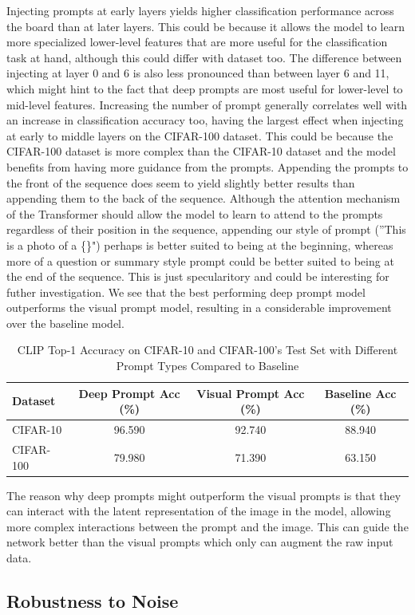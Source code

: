 \documentclass[a4paper]{article}
\begin{document}
Injecting prompts at early layers yields higher classification performance across the board than at later layers. This could be because it allows the model to learn more specialized lower-level
features that are more useful for the classification task at hand, although this could differ with dataset too. The
difference between injecting at layer 0 and 6 is also less pronounced than between layer 6 and 11, which might hint to
the fact that deep prompts are most useful for lower-level to mid-level features.
\newline \newline
Increasing the number of prompt generally correlates well with an increase in classification accuracy too, having
the largest effect when injecting at early to middle layers on the CIFAR-100 dataset. This could be because the
CIFAR-100 dataset is more complex than the CIFAR-10 dataset and the model benefits from having more guidance from the
prompts.
\newline \newline
Appending the prompts to the front of the sequence does seem to yield
slightly better results than appending them to the back of the sequence. Although the attention mechanism of the
Transformer should allow the model to learn to attend to the prompts regardless of their position in the sequence,
appending our style of prompt (''This is a photo of a \{\}") perhaps is better suited to being at the beginning,
whereas more of a question or summary style prompt could be better suited to being at the end of the sequence. This
is just specularitory and could be interesting for futher investigation.
\newline \newline
We see that the best performing deep prompt model outperforms the visual prompt model, resulting in a considerable
improvement over the baseline model. 
\begin{table}[h]
    \centering
    \begin{tabular}{|l|c|c|c|}
    \hline
    \rowcolor{Gray}
    \textbf{Dataset} & \textbf{Deep Prompt Acc (\%)} & \textbf{Visual Prompt Acc (\%)} & \textbf{Baseline Acc (\%)} \\ \hline
    CIFAR-10 & 96.590 & 92.740 & 88.940 \\ \hline
    CIFAR-100 & 79.980 & 71.390 & 63.150 \\ \hline
    \end{tabular}
    \caption{CLIP Top-1 Accuracy on CIFAR-10 and CIFAR-100's Test Set with Different Prompt Types Compared to Baseline}
    \label{tab:clip_accuracy}
\end{table}

The reason why deep prompts might outperform the visual prompts is that they can interact with the latent
representation of the image in the model, allowing more complex interactions between the prompt and the image. This
can guide the network better than the visual prompts which only can augment the raw input data.

\subsection{Robustness to Noise}
\end{document}
